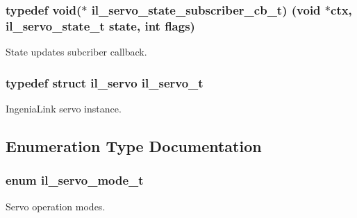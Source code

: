 \subsubsection[{\texorpdfstring{il\+\_\+servo\+\_\+state\+\_\+subscriber\+\_\+cb\+\_\+t}{il_servo_state_subscriber_cb_t}}]{\setlength{\rightskip}{0pt plus 5cm}typedef void($\ast$ il\+\_\+servo\+\_\+state\+\_\+subscriber\+\_\+cb\+\_\+t) (void $\ast$ctx, {\bf il\+\_\+servo\+\_\+state\+\_\+t} state, int flags)}\hypertarget{group__IL__SERVO_ga60c0557ef5bc4c9e1b3bd32ea8d82861}{}\label{group__IL__SERVO_ga60c0557ef5bc4c9e1b3bd32ea8d82861}


State updates subcriber callback. 

\subsubsection[{\texorpdfstring{il\+\_\+servo\+\_\+t}{il_servo_t}}]{\setlength{\rightskip}{0pt plus 5cm}typedef struct il\+\_\+servo {\bf il\+\_\+servo\+\_\+t}}\hypertarget{group__IL__SERVO_ga3369ddfcc33492fe3a28f96cf455b13e}{}\label{group__IL__SERVO_ga3369ddfcc33492fe3a28f96cf455b13e}


Ingenia\+Link servo instance. 



\subsection{Enumeration Type Documentation}
\subsubsection[{\texorpdfstring{il\+\_\+servo\+\_\+mode\+\_\+t}{il_servo_mode_t}}]{\setlength{\rightskip}{0pt plus 5cm}enum {\bf il\+\_\+servo\+\_\+mode\+\_\+t}}\hypertarget{group__IL__SERVO_ga6b3323798a8f235c225cc1d0cd27840a}{}\label{group__IL__SERVO_ga6b3323798a8f235c225cc1d0cd27840a}


Servo operation modes. 

